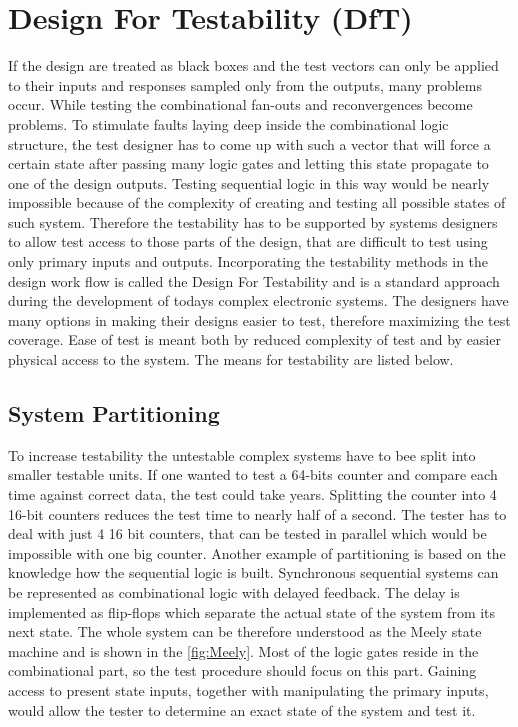 \section{Design For Testability (DfT)}
If the design are treated as black boxes and the test vectors can only be applied to their inputs and responses sampled only from the outputs, many problems occur. While testing the combinational fan-outs and reconvergences become problems. To stimulate faults laying deep inside the combinational logic structure, the test designer has to come up with such a vector that will force a certain state after passing many logic gates and letting this state propagate to one of the design outputs. Testing sequential logic in this way would be nearly impossible because of the complexity of creating and testing all possible states of such system. Therefore the testability has to be supported by systems designers to allow test access to those parts of the design, that are difficult to test using only primary inputs and outputs. Incorporating the testability methods in the design work flow is called the Design For Testability and is a standard approach during the development of todays complex electronic systems. The designers have many options in making their designs easier to test, therefore maximizing the test coverage. Ease of test is meant both by reduced complexity of test and by easier physical access to the system. The means for testability are listed below.
\subsection{System Partitioning}
To increase testability the untestable complex systems have to bee split into smaller testable units. If one wanted to test a 64-bits counter and compare each time against correct data, the test could take years. Splitting the counter into 4 16-bit counters reduces the test time to nearly half of a second. The tester has to deal with just 4 16 bit counters, that can be tested in parallel which would be impossible with one big counter.
Another example of partitioning is based on the knowledge how the sequential logic is built. Synchronous sequential systems can be represented as combinational logic with delayed feedback. The delay is implemented as flip-flops which separate the actual state of the system from its next state. The whole system can be therefore understood as the Meely state machine and is shown in the \autoref{fig:Meely}. Most of the logic gates reside in the combinational part, so the test procedure should focus on this part. Gaining access to present state inputs, together with manipulating the primary inputs, would allow the tester to determine an exact state of the system and test it.

